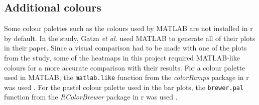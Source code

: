 \vspace{-2mm}

\subsection{Additional colours}
\label{sub:additional_colours}

Some colour palettes such as the colours used by MATLAB are not installed in \gls{r} by default.
In the \citet{Gatza2010a} study, Gatza \textit{et al.} used MATLAB to generate all of their plots in their paper.
Since a visual comparison had to be made with one of the plots from the \citet{Gatza2010a} study, some of the heatmaps in this project required MATLAB-like colours for a more accurate comparison with their results.
For a colour palette used in MATLAB, the \texttt{matlab.like} function from the \textit{colorRamps} package in \gls{r} was used \citep{Keitt2012}.
For the pastel colour palette used in the bar plots, the \texttt{brewer.pal} function from the \textit{RColorBrewer} package in \gls{r} was used \citep{Neuwirth2014}.


